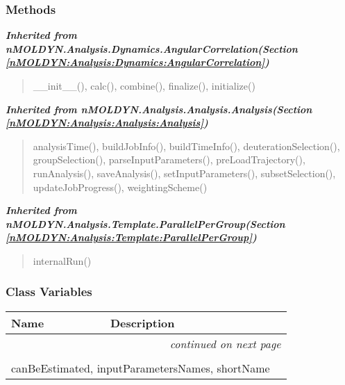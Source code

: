 
  \subsubsection{Methods}


\large{\textbf{\textit{Inherited from nMOLDYN.Analysis.Dynamics.AngularCorrelation\textit{(Section \ref{nMOLDYN:Analysis:Dynamics:AngularCorrelation})}}}}

\begin{quote}
\_\_init\_\_(), calc(), combine(), finalize(), initialize()
\end{quote}

\large{\textbf{\textit{Inherited from nMOLDYN.Analysis.Analysis.Analysis\textit{(Section \ref{nMOLDYN:Analysis:Analysis:Analysis})}}}}

\begin{quote}
analysisTime(), buildJobInfo(), buildTimeInfo(), deuterationSelection(), groupSelection(), parseInputParameters(), preLoadTrajectory(), runAnalysis(), saveAnalysis(), setInputParameters(), subsetSelection(), updateJobProgress(), weightingScheme()
\end{quote}

\large{\textbf{\textit{Inherited from nMOLDYN.Analysis.Template.ParallelPerGroup\textit{(Section \ref{nMOLDYN:Analysis:Template:ParallelPerGroup})}}}}

\begin{quote}
internalRun()
\end{quote}


  \subsubsection{Class Variables}

    \vspace{-1cm}
\hspace{\varindent}\begin{longtable}{|p{\varnamewidth}|p{\vardescrwidth}|l}
\cline{1-2}
\cline{1-2} \centering \textbf{Name} & \centering \textbf{Description}& \\
\cline{1-2}
\endhead\cline{1-2}\multicolumn{3}{r}{\small\textit{continued on next page}}\\\endfoot\cline{1-2}
\endlastfoot\multicolumn{2}{|l|}{\textit{Inherited from nMOLDYN.Analysis.Dynamics.AngularCorrelation \textit{(Section \ref{nMOLDYN:Analysis:Dynamics:AngularCorrelation})}}}\\
\multicolumn{2}{|p{\varwidth}|}{\raggedright canBeEstimated, inputParametersNames, shortName}\\
\cline{1-2}
\end{longtable}

